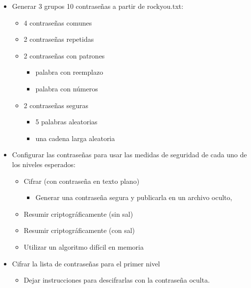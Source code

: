 \documentclass[
  12,
]{scrartcl}
\providecommand{\tightlist}{%
  \setlength{\itemsep}{0pt}\setlength{\parskip}{0pt}}
\begin{document}
\begin{itemize}
\item
  Generar 3 grupos 10 contraseñas a partir de rockyou.txt:

  \begin{itemize}
  \tightlist
  \item
    4 contraseñas comunes
  \item
    2 contraseñas repetidas
  \item
    2 contraseñas con patrones

    \begin{itemize}
    \tightlist
    \item
      palabra con reemplazo
    \item
      palabra con números
    \end{itemize}
  \item
    2 contraseñas seguras

    \begin{itemize}
    \tightlist
    \item
      5 palabras aleatorias
    \item
      una cadena larga aleatoria
    \end{itemize}
  \end{itemize}
\item
  Configurar las contraseñas para usar las medidas de seguridad de cada
  uno de los niveles esperados:

  \begin{itemize}
  \item
    Cifrar (con contraseña en texto plano)

    \begin{itemize}
    \tightlist
    \item
      Generar una contraseña segura y publicarla en un archivo oculto,
    \end{itemize}
  \item
    Resumir criptográficamente (sin sal)
  \item
    Resumir criptográficamente (con sal)
  \item
    Utilizar un algoritmo difícil en memoria
  \end{itemize}
\item
  Cifrar la lista de contraseñas para el primer nivel

  \begin{itemize}
  \item
    Dejar instrucciones para descifrarlas con la contraseña oculta.


\end{itemize}
\end{itemize}
\end{document}
